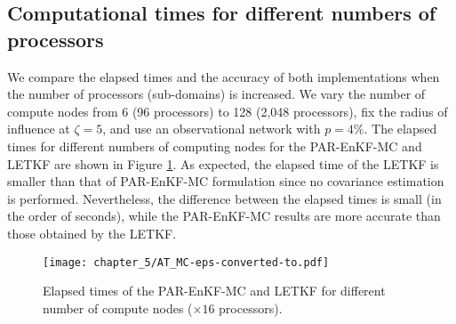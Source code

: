 \documentclass[12pt]{article}
\newcommand{\ra}{\zeta}
\begin{document}
\subsection{Computational times for different numbers of processors}
\label{subsec:elapsed-time-per-processor}
We compare the elapsed times and the accuracy of both implementations when the number of processors (sub-domains) is increased. We vary the number of compute nodes from 6 (96 processors) to 128 (2,048 processors), fix the radius of influence at $\ra=5$, and use an observational network with $p=4\%$. The elapsed times for different numbers of computing nodes for the PAR-EnKF-MC and LETKF are shown in Figure \ref{fig:elapsed-times}. As expected, the elapsed time of the LETKF is smaller than that of PAR-EnKF-MC formulation since no covariance estimation is performed. Nevertheless, the difference between the elapsed times is small (in the order of seconds), while the PAR-EnKF-MC results are more accurate than those obtained by the LETKF.
\begin{figure}[H]
\centering
\texttt{[image: chapter\_5/AT\_MC-eps-converted-to.pdf]}
\caption{Elapsed times of the PAR-EnKF-MC and LETKF for different number of compute nodes ($\times 16$ processors).}
\label{fig:elapsed-times}
\end{figure}
\end{document}
